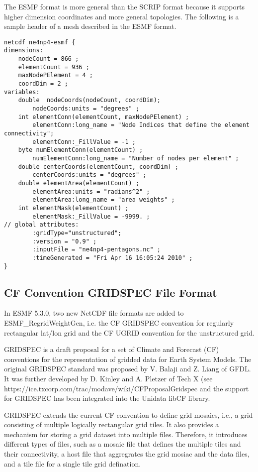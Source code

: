 The ESMF format is more general than the SCRIP format because it supports higher dimension coordinates and 
more general topologies.  
The following is a sample header of a mesh described in the ESMF format.
 
\begin{verbatim}
netcdf ne4np4-esmf {
dimensions:	
	nodeCount = 866 ;
	elementCount = 936 ;
	maxNodePElement = 4 ;
	coordDim = 2 ;
variables:	
	double 	nodeCoords(nodeCount, coordDim);
		nodeCoords:units = "degrees" ;
	int elementConn(elementCount, maxNodePElement) ;
		elementConn:long_name = "Node Indices that define the element connectivity";
		elementConn:_FillValue = -1 ;	
	byte numElementConn(elementCount) ;
		numElementConn:long_name = "Number of nodes per element" ;
	double centerCoords(elementCount, coordDim) ;
		centerCoords:units = "degrees" ;
	double elementArea(elementCount) ;
		elementArea:units = "radians^2" ;
		elementArea:long_name = "area weights" ;
	int elementMask(elementCount) ;
		elementMask:_FillValue = -9999. ;
// global attributes:
		:gridType="unstructured";
		:version = "0.9" ;
		:inputFile = "ne4np4-pentagons.nc" ;
		:timeGenerated = "Fri Apr 16 16:05:24 2010" ;
}
\end{verbatim}

\subsection{CF Convention GRIDSPEC File Format}\label{sec:fileformat:gridspec}

In ESMF 5.3.0, two new NetCDF file formats are added to ESMF_RegridWeightGen, i.e. the CF GRIDSPEC convention 
for regularly rectangular lat/lon grid and the CF UGRID convention for the unstructured grid.

GRIDSPEC is a draft proposal for a set of Climate and Forecast (CF) conventions for the representation of gridded data for Earth System Models.  The original GRIDSPEC standard was proposed by V. Balaji and Z. Liang of GFDL.  It was further developed by D. Kinley and A. Pletzer of Tech X (see  {https://ice.txcorp.com/trac/modave/wiki/CFProposalGridspec} and the support for GRIDSPEC has been integrated into the Unidata libCF library.

GRIDSPEC extends the current CF convention to define grid mosaics, i.e., a grid consisting of multiple logically 
rectangular grid tiles. It also provides a mechanism for storing a grid dataset into multiple files.  Therefore, 
it introduces different types of files, such as a mosaic file that defines the multiple tiles and their 
connectivity, a host file that aggregrates the grid mosiac and the data files, and a tile file for a single tile
grid defination.  

